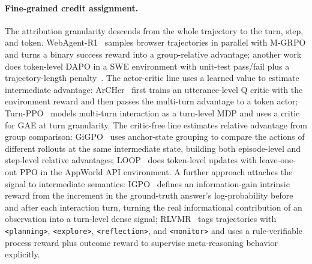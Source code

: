 \paragraph{Fine-grained credit assignment.} The attribution granularity descends from the whole trajectory to the turn, step, and token. WebAgent-R1~\cite{Wei25} samples browser trajectories in parallel with M-GRPO and turns a binary success reward into a group-relative advantage; another work does token-level DAPO in a SWE environment with unit-test pass/fail plus a trajectory-length penalty~\cite{Gol25}. The actor-critic line uses a learned value to estimate intermediate advantage: ArCHer~\cite{Zho24f} first trains an utterance-level Q critic with the environment reward and then passes the multi-turn advantage to a token actor; Turn-PPO~\cite{Li25ae} models multi-turn interaction as a turn-level MDP and uses a critic for GAE at turn granularity. The critic-free line estimates relative advantage from group comparison: GiGPO~\cite{Fen25c} uses anchor-state grouping to compare the actions of different rollouts at the same intermediate state, building both episode-level and step-level relative advantages; LOOP~\cite{Che25af} does token-level updates with leave-one-out PPO in the AppWorld API environment. A further approach attaches the signal to intermediate semantics: IGPO~\cite{Wan25y} defines an information-gain intrinsic reward from the increment in the ground-truth answer's log-probability before and after each interaction turn, turning the real informational contribution of an observation into a turn-level dense signal; RLVMR~\cite{Zha25ao} tags trajectories with \texttt{<planning>}, \texttt{<explore>}, \texttt{<reflection>}, and \texttt{<monitor>} and uses a rule-verifiable process reward plus outcome reward to supervise meta-reasoning behavior explicitly.

